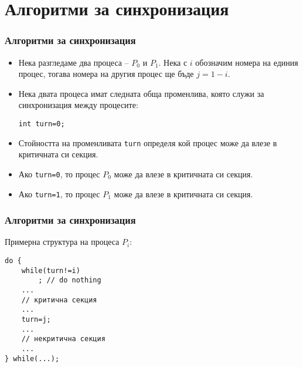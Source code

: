 \documentclass[ignorenonframetext, hyperref=unicode]{beamer}
\begin{document}
\section{Алгоритми за синхронизация}

\begin{frame}[containsverbatim]
\frametitle{Алгоритми за синхронизация}
\begin{itemize}
  \item Нека разгледаме два процеса -- $P_0$ и $P_1$. Нека с $i$ обозначим
  номера на единия процес, тогава номера на другия процес ще бъде $j=1-i$.
  \item Нека двата процеса имат следната обща променлива, която служи за
  синхронизация между процесите:
\begin{lstlisting}[numbers=none]
int turn=0;
\end{lstlisting}
  \item Стойността на променливата \lstinline{turn} определя кой процес може да
  влезе в критичната си секция. 
  \item Ако \lstinline{turn=0}, то процес $P_0$ може да
  влезе в критичната си секция. 
  \item Ако \lstinline{turn=1}, то процес $P_1$ може да
  влезе в критичната си секция.
\end{itemize}
\end{frame}

\begin{frame}[containsverbatim]
\frametitle{Алгоритми за синхронизация}
Примерна структура на процеса $P_i$:
\begin{lstlisting}
do {
	while(turn!=i)
		; // do nothing
	...
	// критична секция
	...
	turn=j;
	...
	// некритична секция
	...
} while(...);
\end{lstlisting}
\end{frame}
\end{document}

